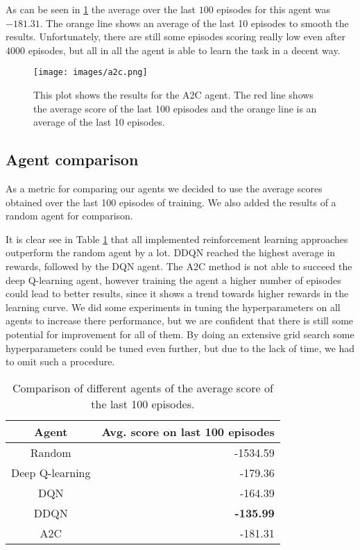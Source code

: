\documentclass[11pt,a4paper]{article}
\begin{document}
As can be seen in \ref{fig:a2c_result} the average over the last $100$ episodes for this agent was $-181.31$. The orange line shows an average of the last 10 episodes to smooth the results. Unfortunately, there are still some episodes scoring really low even after $4000$ episodes, but all in all the agent is able to learn the task in a decent way.

\begin{figure}[h]
  \centering
  \texttt{[image: images/a2c.png]}
  \caption{This plot shows the results for the A2C agent. The red line shows the average score of the last 100 episodes and the orange line is an average of the last 10 episodes.}
  \label{fig:a2c_result}
\end{figure}

\subsection{Agent comparison}

As a metric for comparing our agents we decided to use the average scores obtained over the last 100 episodes of training. We also added the results of a random agent for comparison.

It is clear see in Table \ref{tab:score_comparison} that all implemented reinforcement learning approaches outperform the random agent by a lot. DDQN reached the highest average in rewards, followed by the DQN agent. The A2C method is not able to succeed the deep Q-learning agent, however training the agent a higher number of episodes could lead to better results, since it shows a trend towards higher rewards in the learning curve. 
We did some experiments in tuning the hyperparameters on all agents to increase there performance, but we are confident that there is still some potential for improvement for all of them. By doing an extensive grid search some hyperparameters could be tuned even further, but due to the lack of time, we had to omit such a procedure.

\begin{table}[h]
    \centering
    \begin{tabular}{|c|r|}
         Agent & Avg. score on last 100 episodes \\ 
         \hline
         Random &  -1534.59\\
         Deep Q-learning &  -179.36\\
         DQN & -164.39\\
         DDQN & \textbf{-135.99}\\
         A2C & -181.31\\
    \end{tabular}
    \caption{Comparison of different agents of the average score of the last 100 episodes.}
    \label{tab:score_comparison}
\end{table}
\end{document}
